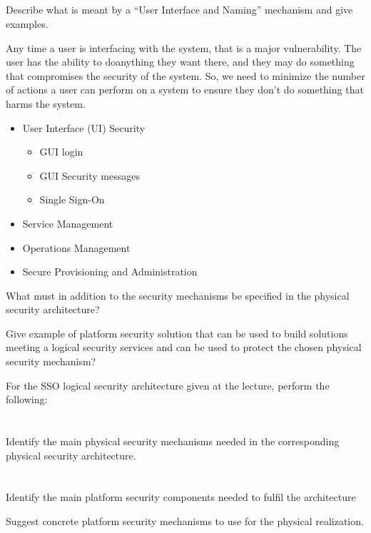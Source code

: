\begin{questions}
\begin{parts}
  \part{} Describe what is meant by a ``User Interface and Naming'' mechanism and give examples.
    \begin{solution}
      Any time a user is interfacing with the system, that is a major vulnerability.
      The user has the ability to doanything they want there, and they may do something that compromises the security of the system.
      So, we need to minimize the number of actions a user can perform on a system to ensure they don't do something that harms the system.
      \begin{itemize}[noitemsep]
      \item User Interface (UI) Security
        \begin{itemize}[noitemsep]
        \item GUI login
        \item GUI Security messages
        \item Single Sign-On
        \end{itemize}
      \item Service Management
      \item Operations Management
      \item Secure Provisioning and Administration
      \end{itemize}
    \end{solution}

  \end{parts}

\item What must in addition to the security mechanisms be specified in the physical security architecture?
\item Give example of platform security solution that can be used to build solutions meeting a logical security services and can be used to protect the chosen physical security mechanism?
\item For the SSO logical security architecture given at the lecture, perform the following:
  \begin{parts}
  \part{} Identify the main physical security mechanisms needed in the corresponding physical security architecture.
  \part{} Identify the main platform security components needed to fulfil the architecture
    \begin{subparts}
    \subpart{} Suggest concrete platform security mechanisms to use for the physical realization.
    \end{subparts}
  \end{parts}
\end{questions}

